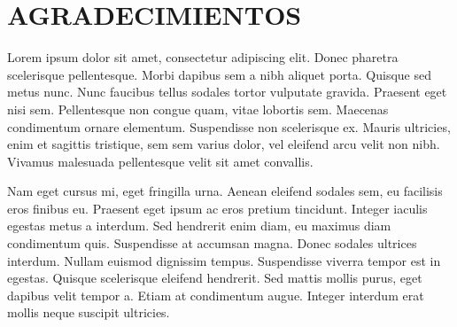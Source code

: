 \chapter*{AGRADECIMIENTOS}


Lorem ipsum dolor sit amet, consectetur adipiscing elit. Donec pharetra scelerisque pellentesque. Morbi dapibus sem a nibh aliquet porta. Quisque sed metus nunc. Nunc faucibus tellus sodales tortor vulputate gravida. Praesent eget nisi sem. Pellentesque non congue quam, vitae lobortis sem. Maecenas condimentum ornare elementum. Suspendisse non scelerisque ex. Mauris ultricies, enim et sagittis tristique, sem sem varius dolor, vel eleifend arcu velit non nibh. Vivamus malesuada pellentesque velit sit amet convallis.

Nam eget cursus mi, eget fringilla urna. Aenean eleifend sodales sem, eu facilisis eros finibus eu. Praesent eget ipsum ac eros pretium tincidunt. Integer iaculis egestas metus a interdum. Sed hendrerit enim diam, eu maximus diam condimentum quis. Suspendisse at accumsan magna. Donec sodales ultrices interdum. Nullam euismod dignissim tempus. Suspendisse viverra tempor est in egestas. Quisque scelerisque eleifend hendrerit. Sed mattis mollis purus, eget dapibus velit tempor a. Etiam at condimentum augue. Integer interdum erat mollis neque suscipit ultricies.


\newpage 